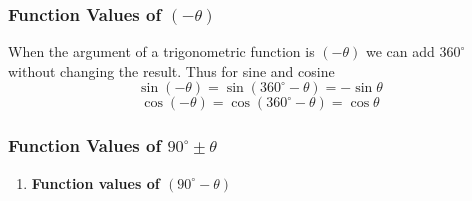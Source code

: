 \subsubsection{Function Values of $(-\theta)$}
When the argument of a trigonometric function is $(-\theta)$ we can add $360^\circ$ without changing the result. Thus for sine and cosine
\[\sin (-\theta) = \sin (360^\circ-\theta) = -\sin\theta\]
\[ \cos (-\theta) = \cos(360^\circ-\theta) = \cos\theta\]

\subsubsection{Function Values of $90^\circ \pm \theta$}

{
\begin{enumerate}
\item \textbf{Function values of $(90^\circ-\theta)$}\\


\end{enumerate}}
